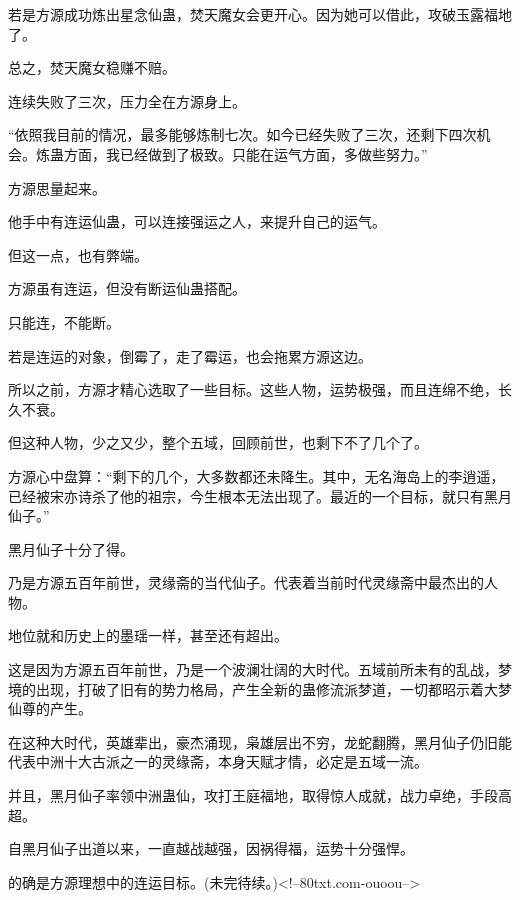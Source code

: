 \begin{this_body}
若是方源成功炼出星念仙蛊，焚天魔女会更开心。因为她可以借此，攻破玉露福地了。

总之，焚天魔女稳赚不赔。

连续失败了三次，压力全在方源身上。

“依照我目前的情况，最多能够炼制七次。如今已经失败了三次，还剩下四次机会。炼蛊方面，我已经做到了极致。只能在运气方面，多做些努力。”

方源思量起来。

他手中有连运仙蛊，可以连接强运之人，来提升自己的运气。

但这一点，也有弊端。

方源虽有连运，但没有断运仙蛊搭配。

只能连，不能断。

若是连运的对象，倒霉了，走了霉运，也会拖累方源这边。

所以之前，方源才精心选取了一些目标。这些人物，运势极强，而且连绵不绝，长久不衰。

但这种人物，少之又少，整个五域，回顾前世，也剩下不了几个了。

方源心中盘算：“剩下的几个，大多数都还未降生。其中，无名海岛上的李逍遥，已经被宋亦诗杀了他的祖宗，今生根本无法出现了。最近的一个目标，就只有黑月仙子。”

黑月仙子十分了得。

乃是方源五百年前世，灵缘斋的当代仙子。代表着当前时代灵缘斋中最杰出的人物。

地位就和历史上的墨瑶一样，甚至还有超出。

这是因为方源五百年前世，乃是一个波澜壮阔的大时代。五域前所未有的乱战，梦境的出现，打破了旧有的势力格局，产生全新的蛊修流派梦道，一切都昭示着大梦仙尊的产生。

在这种大时代，英雄辈出，豪杰涌现，枭雄层出不穷，龙蛇翻腾，黑月仙子仍旧能代表中洲十大古派之一的灵缘斋，本身天赋才情，必定是五域一流。

并且，黑月仙子率领中洲蛊仙，攻打王庭福地，取得惊人成就，战力卓绝，手段高超。

自黑月仙子出道以来，一直越战越强，因祸得福，运势十分强悍。

的确是方源理想中的连运目标。(未完待续。)<!--80txt.com-ouoou-->

\end{this_body}

